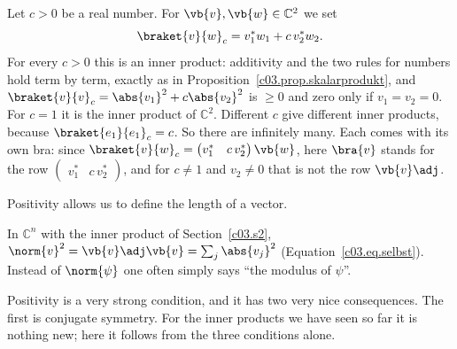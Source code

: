\begin{example}\label{c03.ex.gewichtet}
  Let $c > 0$ be a real number. For $\vb{v}, \vb{w} \in \mathbb{C}^2$ we set
  \begin{equation}\label{c03.eq.gewichtet}
    \braket{v}{w}_c = v_1^* w_1 + c\, v_2^* w_2 .
  \end{equation}
  For every $c > 0$ this is an inner product: additivity and the two rules for numbers hold
  term by term, exactly as in Proposition~\ref{c03.prop.skalarprodukt}, and
  $\braket{v}{v}_c = \abs{v_1}^2 + c \abs{v_2}^2$ is $\geq 0$ and zero only if
  $v_1 = v_2 = 0$. For $c = 1$ it is the inner product of $\mathbb{C}^2$. Different $c$ give
  different inner products, because $\braket{e_1}{e_1}_c = c$. So there are infinitely many.
  Each comes with its own bra: since
  $\braket{v}{w}_c = \begin{pmatrix} v_1^* & c\, v_2^* \end{pmatrix} \vb{w}$, here $\bra{v}$
  stands for the row $\begin{pmatrix} v_1^* & c\, v_2^* \end{pmatrix}$, and for $c \neq 1$ and
  $v_2 \neq 0$ that is not the row $\vb{v}\adj$.
\end{example}

Positivity allows us to define the length of a vector.


In $\mathbb{C}^n$ with the inner product of Section~\ref{c03.s2},
$\norm{v}^2 = \vb{v}\adj\vb{v} = \sum_j \abs{v_j}^2$ (Equation~\eqref{c03.eq.selbst}). Instead of $\norm{\psi}$ one often simply says ``the modulus
of $\psi$''.

Positivity is a very strong condition, and it has two very nice consequences. The first is
conjugate symmetry. For the inner products we have seen so far it is nothing new; here it
follows from the three conditions alone.


